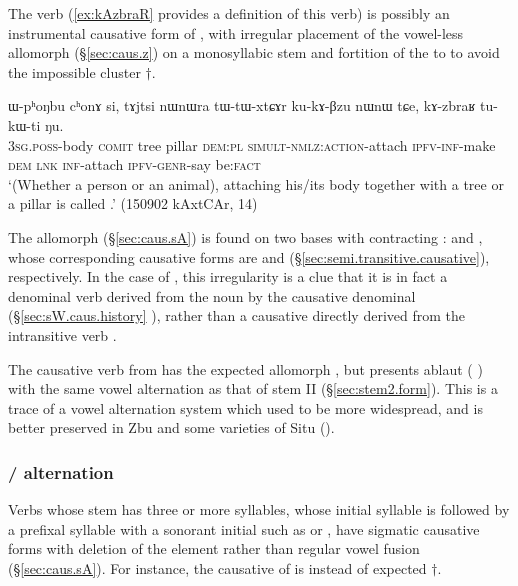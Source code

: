The verb  (\ref{ex:kAzbraR} provides a definition of this verb) is possibly an instrumental causative form of , with irregular placement of the vowel-less allomorph  (§\ref{sec:caus.z}) on a monosyllabic stem and fortition of the  to  to avoid the impossible cluster $\dagger$.

\begin{exe} 
\ex \label{ex:kAzbraR}
\gll ɯ-pʰoŋbu cʰonɤ si, tɤjtsi nɯnɯra tɯ-tɯ-xtɕɤr ku-kɤ-βzu nɯnɯ tɕe, kɤ-zbraʁ tu-kɯ-ti ŋu.  \\
\textsc{3sg}.\textsc{poss}-body \textsc{comit} tree pillar \textsc{dem}:\textsc{pl}  \textsc{simult}-\textsc{nmlz}:\textsc{action}-attach \textsc{ipfv}-\textsc{inf}-make \textsc{dem} \textsc{lnk} \textsc{inf}-attach \textsc{ipfv}-\textsc{genr}-say be:\textsc{fact} \\
\glt `(Whether a person or an animal), attaching his/its body together with a tree or a pillar is called .' (150902 kAxtCAr, 14)
\end{exe}
 
The  allomorph (§\ref{sec:caus.sA}) is found on two bases with contracting :  and , whose corresponding causative forms are   and  (§\ref{sec:semi.transitive.causative}), respectively. In the case of , this irregularity is a clue that it is in fact a denominal verb derived from the noun  by the causative denominal (§\ref{sec:sW.caus.history} ), rather than a causative directly derived from the intransitive verb .

 The causative verb  from  has the expected allomorph , but presents ablaut ( \fl{} ) with the same vowel alternation as that of stem II (§\ref{sec:stem2.form}). This is a trace of a vowel alternation system which used to be more widespread, and is better preserved in Zbu \citep{gong18these} and some varieties of Situ (\citealt[304, fn 10]{zhangsy18stem}).

  \subsubsection{/ alternation} \label{sec:sigm.caus.a.z}
Verbs whose stem has three or more syllables, whose initial syllable is  followed by a prefixal syllable with a sonorant initial such as  or , have sigmatic causative forms with deletion of the  element rather than regular vowel fusion (§\ref{sec:caus.sA}). For instance, the causative of  is  instead of expected $\dagger$.

